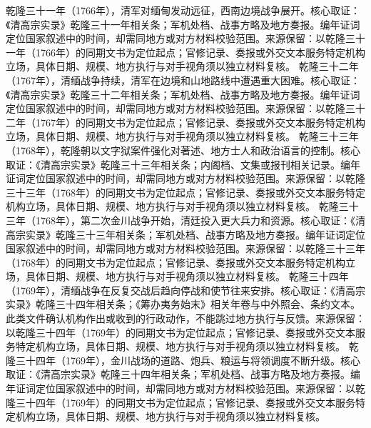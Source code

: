 乾隆三十一年（1766年），清军对缅甸发动远征，西南边境战争展开。核心取证：《清高宗实录》乾隆三十一年相关条；军机处档、战事方略及地方奏报。编年证词定位国家叙述中的时间，却需同地方或对方材料校验范围。来源保留：以乾隆三十一年（1766年）的同期文书为定位起点；官修记录、奏报或外交文本服务特定机构立场，具体日期、规模、地方执行与对手视角须以独立材料复核。
乾隆三十二年（1767年），清缅战争持续，清军在边境和山地路线中遭遇重大困难。核心取证：《清高宗实录》乾隆三十二年相关条；军机处档、战事方略及地方奏报。编年证词定位国家叙述中的时间，却需同地方或对方材料校验范围。来源保留：以乾隆三十二年（1767年）的同期文书为定位起点；官修记录、奏报或外交文本服务特定机构立场，具体日期、规模、地方执行与对手视角须以独立材料复核。
乾隆三十三年（1768年），乾隆朝以文字狱案件强化对著述、地方士人和政治语言的控制。核心取证：《清高宗实录》乾隆三十三年相关条；内阁档、文集或报刊相关记录。编年证词定位国家叙述中的时间，却需同地方或对方材料校验范围。来源保留：以乾隆三十三年（1768年）的同期文书为定位起点；官修记录、奏报或外交文本服务特定机构立场，具体日期、规模、地方执行与对手视角须以独立材料复核。
乾隆三十三年（1768年），第二次金川战争开始，清廷投入更大兵力和资源。核心取证：《清高宗实录》乾隆三十三年相关条；军机处档、战事方略及地方奏报。编年证词定位国家叙述中的时间，却需同地方或对方材料校验范围。来源保留：以乾隆三十三年（1768年）的同期文书为定位起点；官修记录、奏报或外交文本服务特定机构立场，具体日期、规模、地方执行与对手视角须以独立材料复核。
乾隆三十四年（1769年），清缅战争在反复交战后趋向停战和使节往来安排。核心取证：《清高宗实录》乾隆三十四年相关条；《筹办夷务始末》相关年卷与中外照会、条约文本。此类文件确认机构作出或收到的行政动作，不能跳过地方执行与反馈。来源保留：以乾隆三十四年（1769年）的同期文书为定位起点；官修记录、奏报或外交文本服务特定机构立场，具体日期、规模、地方执行与对手视角须以独立材料复核。
乾隆三十四年（1769年），金川战场的道路、炮兵、粮运与将领调度不断升级。核心取证：《清高宗实录》乾隆三十四年相关条；军机处档、战事方略及地方奏报。编年证词定位国家叙述中的时间，却需同地方或对方材料校验范围。来源保留：以乾隆三十四年（1769年）的同期文书为定位起点；官修记录、奏报或外交文本服务特定机构立场，具体日期、规模、地方执行与对手视角须以独立材料复核。
